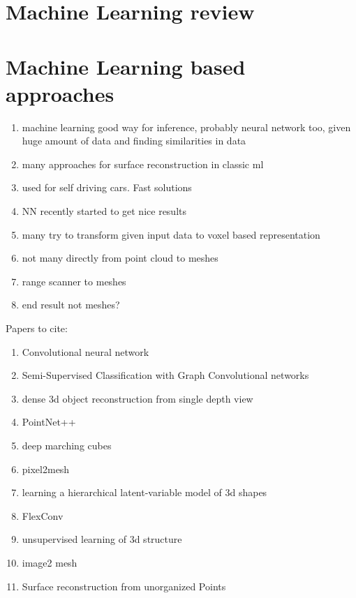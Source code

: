 \section{Machine Learning review}
\label{ml_review}

\section{Machine Learning based approaches}
\label{ml_approaches}
\begin{enumerate}
  \item machine learning good way for inference, probably neural network too, given huge amount of data and finding similarities in data
  \item many approaches for surface reconstruction in classic ml
  \item used for self driving cars. Fast solutions
  \item NN recently started to get nice results
  \item many try to transform given input data to voxel based representation
  \item not many directly from point cloud to meshes
  \item range scanner to meshes
  \item end result not meshes?
\end{enumerate}
Papers to cite:
\begin{enumerate}
  \item Convolutional neural network
  \item Semi-Supervised Classification with Graph Convolutional networks
  \item dense 3d object reconstruction from single depth view
  \item PointNet++
  \item deep marching cubes
  \item pixel2mesh
  \item learning a hierarchical latent-variable model of 3d shapes
  \item FlexConv
  \item unsupervised learning of 3d structure
  \item image2 mesh
  \item Surface reconstruction from unorganized Points
\end{enumerate}
